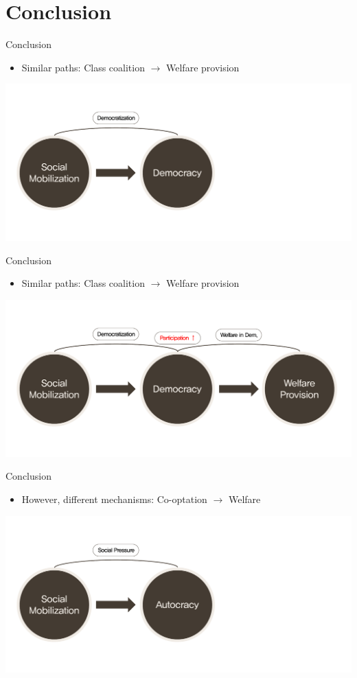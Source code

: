 \documentclass{Bredelebeamer}
\begin{document}
\section{Conclusion}
\begin{frame}{Conclusion}
	\begin{itemize}
		\item Similar paths: Class coalition $\rightarrow$ Welfare provision \pause
	\end{itemize}
	\centering
	\includegraphics[width=1\linewidth]{"P/PR 1"}
\end{frame}

\begin{frame}{Conclusion}
	\begin{itemize}
		\item Similar paths: Class coalition $\rightarrow$ Welfare provision
	\end{itemize}
	\centering
	\includegraphics[width=1\linewidth]{"P/PR 2"}
\end{frame}

\begin{frame}{Conclusion}
	\begin{itemize}
	\item However, different mechanisms: Co-optation $\rightarrow$ Welfare \pause
	\end{itemize}
	\centering
	\includegraphics[width=1\linewidth]{"P/PR 3"}
\end{frame}
\end{document}
